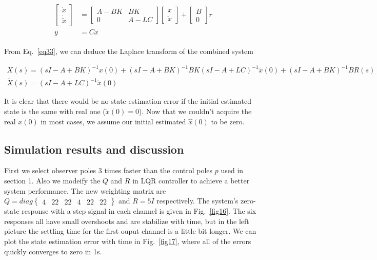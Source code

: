 \documentclass[hyperref]{article}
\theoremstyle{nonumberplain}
\begin{document}
	\begin{equation}
	\begin{split}
	\begin{aligned}
		\begin{bmatrix}
		\dot{x}\\ \dot{\tilde{x}}
		\end{bmatrix}&=\begin{bmatrix}
		A-BK &BK \\ 
		0 &A-LC 
		\end{bmatrix}
		\begin{bmatrix}
		x\\\tilde{x} 
		\end{bmatrix}+
		\begin{bmatrix}
		B\\0 	
		\end{bmatrix}r
		\\
		y&=Cx
	\label{eq33}
	\end{aligned}
	\end{split}
	\end{equation}
	
	From Eq.~\ref{eq33}, we can deduce the Laplace transform of the combined system
	
	\begin{gather}
	X(s)=(sI-A+BK)^{-1}x(0)+(sI-A+BK)^{-1}BK(sI-A+LC)^{-1}\tilde{x}(0)+(sI-A+BK)^{-1}BR(s) \nonumber\\
	\tilde{X}(s)=(sI-A+LC)^{-1}\tilde{x}(0)
	\label{eq34}
	\end{gather}
	
	It is clear that there would be no state estimation error if the initial estimated state is the same with real one ($\tilde{x}(0)=0$). Now that we couldn't acquire the real $x(0)$ in most cases, we assume our initial estimated $\hat{x}(0)$ to be zero.
	
	
	\subsection{Simulation results and discussion}
	
	\hspace{1.0em}
	First we select observer poles 3 times faster than the control poles $p$ used in section 1. Also we modeify the $Q$ and $R$ in LQR controller to achieve a better system performance. The new weighting matrix are $Q=diag\begin{Bmatrix}
	4&  22&  22&  4&  22&22 
	\end{Bmatrix}$ and $R=5I$ respectively. The system's zero-state response with a step signal in each channel is given in Fig.~\ref{fig16}. The six responses all have small overshoots and are stabilize with time, but in the left picture the settling time for the first ouput channel is a little bit longer. We can plot the state estimation error with time in Fig.~\ref{fig17}, where all of the errors quickly converges to zero in 1s.
	
\end{document}
